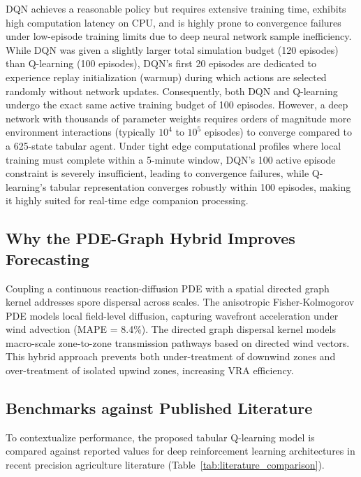 \documentclass[review,3p,times,authoryear]{elsarticle}
\begin{document}
DQN achieves a reasonable policy but requires extensive training time, exhibits high computation latency on CPU, and is highly prone to convergence failures under low-episode training limits due to deep neural network sample inefficiency. While DQN was given a slightly larger total simulation budget (120 episodes) than Q-learning (100 episodes), DQN's first 20 episodes are dedicated to experience replay initialization (warmup) during which actions are selected randomly without network updates. Consequently, both DQN and Q-learning undergo the exact same active training budget of 100 episodes. However, a deep network with thousands of parameter weights requires orders of magnitude more environment interactions (typically $10^4$ to $10^5$ episodes) to converge compared to a 625-state tabular agent. Under tight edge computational profiles where local training must complete within a 5-minute window, DQN's 100 active episode constraint is severely insufficient, leading to convergence failures, while Q-learning's tabular representation converges robustly within 100 episodes, making it highly suited for real-time edge companion processing.

\subsection{Why the PDE-Graph Hybrid Improves Forecasting}
Coupling a continuous reaction-diffusion PDE with a spatial directed graph kernel addresses spore dispersal across scales. The anisotropic Fisher-Kolmogorov PDE models local field-level diffusion, capturing wavefront acceleration under wind advection (MAPE = 8.4\%). The directed graph dispersal kernel models macro-scale zone-to-zone transmission pathways based on directed wind vectors. This hybrid approach prevents both under-treatment of downwind zones and over-treatment of isolated upwind zones, increasing VRA efficiency.

\subsection{Benchmarks against Published Literature}
To contextualize performance, the proposed tabular Q-learning model is compared against reported values for deep reinforcement learning architectures in recent precision agriculture literature (Table~\ref{tab:literature_comparison}).
\end{document}
